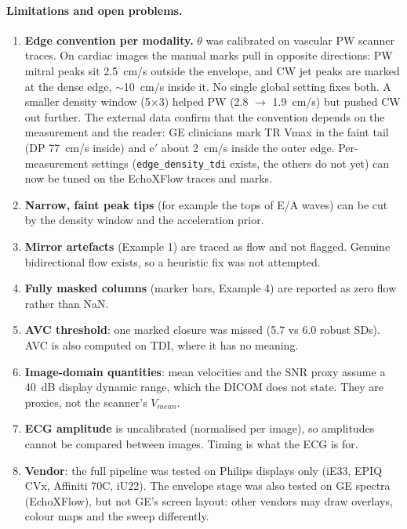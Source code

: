 \documentclass[10pt,a4paper]{article}
\newcommand{\code}[1]{\texttt{\small #1}}
\begin{document}
\paragraph{Limitations and open problems.}
\begin{enumerate}
\item \textbf{Edge convention per modality.} $\theta$ was calibrated on vascular PW scanner traces. On cardiac images the manual marks pull
in opposite directions: PW mitral peaks sit 2.5~cm/s outside the envelope, and CW jet peaks are marked at the dense edge, $\sim$10~cm/s inside
it. No single global setting fixes both. A smaller density window (5$\times$3) helped PW (2.8 $\to$ 1.9~cm/s) but pushed CW out further.
The external data confirm that the convention depends on the measurement and the reader: GE clinicians mark TR Vmax in the faint tail
(DP 77~cm/s inside) and e$'$ about 2~cm/s inside the outer edge. Per-measurement settings (\code{edge\_density\_tdi} exists, the others do not
yet) can now be tuned on the EchoXFlow traces and marks.
\item \textbf{Narrow, faint peak tips} (for example the tops of E/A waves) can be cut by the density window and the acceleration prior.
\item \textbf{Mirror artefacts} (Example 1) are traced as flow and not flagged. Genuine bidirectional flow exists, so a heuristic fix was not attempted.
\item \textbf{Fully masked columns} (marker bars, Example 4) are reported as zero flow rather than NaN.
\item \textbf{AVC threshold}: one marked closure was missed (5.7 vs 6.0 robust SDs). AVC is also computed on TDI, where it has no meaning.
\item \textbf{Image-domain quantities}: mean velocities and the SNR proxy assume a 40~dB display dynamic range, which the DICOM does not state.
They are proxies, not the scanner's $V_{mean}$.
\item \textbf{ECG amplitude} is uncalibrated (normalised per image), so amplitudes cannot be compared between images. Timing is what the ECG is for.
\item \textbf{Vendor}: the full pipeline was tested on Philips displays only (iE33, EPIQ CVx, Affiniti 70C, iU22). The envelope stage was also
tested on GE spectra (EchoXFlow), but not GE's screen layout: other vendors may draw overlays, colour maps and the sweep differently.
\end{enumerate}

\end{document}
